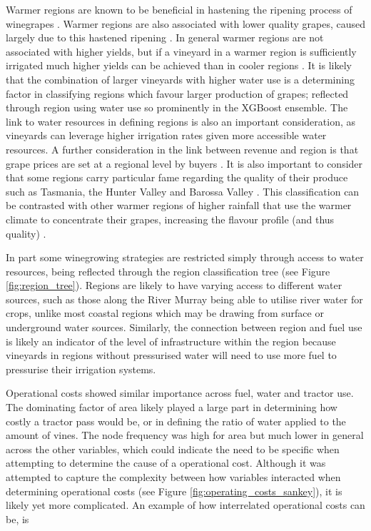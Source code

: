 \documentclass[review,12pt,authoryear]{elsarticle}
\begin{document}
\begin{linenumbers}
Warmer regions are known to be beneficial in hastening the ripening process of winegrapes \citep{webbObservedTrendsWinegrape2011}. Warmer regions are also associated with lower quality grapes, caused largely due to this hastened ripening \citep{botting1996canopy}. In general warmer regions are not associated with higher yields, but if a vineyard in a warmer region is sufficiently irrigated much higher yields can be achieved than in cooler regions \citep{campsGrapeHarvestYield2012}. It is likely that the combination of larger vineyards with higher water use is a determining factor in classifying regions which favour larger production of grapes; reflected through region using water use so prominently in the XGBoost ensemble. The link to water resources in defining regions is also an important consideration, as vineyards can leverage higher irrigation rates given more accessible water resources. A further consideration in the link between revenue and region is that grape prices are set at a regional level by buyers \citep{wineaustraliaNationalVintageReport2022}. It is also important to consider that some regions carry particular fame regarding the quality of their produce such as Tasmania, the Hunter Valley and Barossa Valley \citep{hallidayAustralianWineEncyclopedia2009}. This classification can be contrasted with other warmer regions of higher rainfall that use the warmer climate to concentrate their grapes, increasing the flavour profile (and thus quality) \citep{goodwinijeriepRegulatedDeficitIrrigation1992,mgmccarthyEffectCropLoad1986}.
\par
In part some winegrowing strategies are restricted simply through access to water resources, being reflected through the region classification tree (see Figure \ref{fig:region_tree}). Regions are likely to have varying access to different water sources, such as those along the River Murray being able to utilise river water for crops, unlike most coastal regions which may be drawing from surface or underground water sources. Similarly, the connection between region and fuel use is likely an indicator of the level of infrastructure within the region because vineyards in regions without pressurised water will need to use more fuel to pressurise their irrigation systems.
\par
Operational costs showed similar importance across fuel, water and tractor use. The dominating factor of area likely played a large part in determining how costly a tractor pass would be, or in defining the ratio of water applied to the amount of vines. The node frequency was high for area but much lower in general across the other variables, which could indicate the need to be specific when attempting to determine the cause of a operational cost. Although it was attempted to capture the complexity between how variables interacted when determining operational costs (see Figure \ref{fig:operating_costs_sankey}), it is likely yet more complicated. An example of how interrelated operational costs can be, is 

\end{linenumbers}
\end{document}
